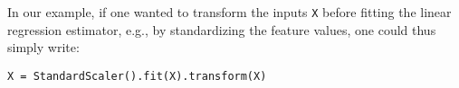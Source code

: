 \documentclass{llncs}
\begin{document}
In our example, if one wanted to transform the inputs \texttt{X} before
fitting the linear regression estimator, e.g., by standardizing the feature values,
one could thus simply write:
\begin{center}
\texttt{X = StandardScaler().fit(X).transform(X)}
\end{center}



\end{document}
